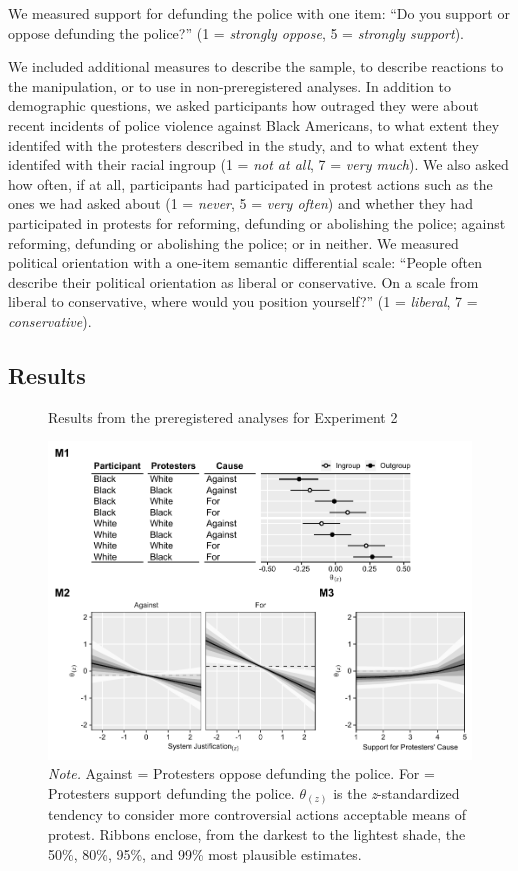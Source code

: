 \documentclass[12pt, letterpaper]{article}
\begin{document}
We measured support for defunding the police with one item: ``Do you
support or oppose defunding the police?'' (1 = \emph{strongly oppose}, 5
= \emph{strongly support}).

We included additional measures to describe the sample, to describe
reactions to the manipulation, or to use in non-preregistered analyses.
In addition to demographic questions, we asked participants how outraged
they were about recent incidents of police violence against Black
Americans, to what extent they identifed with the protesters described
in the study, and to what extent they identifed with their racial
ingroup (1 = \emph{not at all}, 7 = \emph{very much}). We also asked how
often, if at all, participants had participated in protest actions such
as the ones we had asked about (1 = \emph{never}, 5 = \emph{very often})
and whether they had participated in protests for reforming, defunding
or abolishing the police; against reforming, defunding or abolishing the
police; or in neither. We measured political orientation with a one-item
semantic differential scale: ``People often describe their political
orientation as liberal or conservative. On a scale from liberal to
conservative, where would you position yourself?'' (1 = \emph{liberal},
7 = \emph{conservative}).

\hypertarget{results-1}{%
\subsection{Results}\label{results-1}}

\begin{figure}[!t]
\centering
\caption{Results from the preregistered analyses for Experiment 2}
\includegraphics[scale=1]{../Experiment 2/figures/figure-4}
\caption*{\textit{Note.} Against = Protesters oppose defunding the police. For = Protesters support defunding the police. $\theta_{(z)}$ is the \textit{z}-standardized tendency to consider more controversial actions acceptable means of protest. Ribbons enclose, from the darkest to the lightest shade, the 50\%, 80\%, 95\%, and 99\% most plausible estimates.}
\label{fig:f4}
\end{figure}
\end{document}
